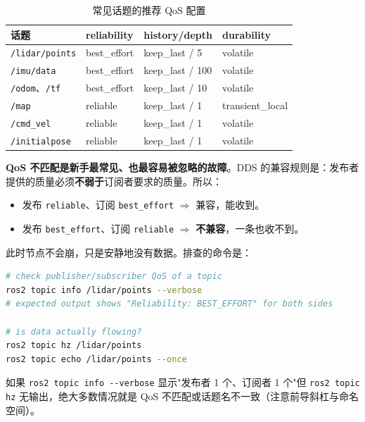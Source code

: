 \begin{table}[htbp]
  \centering
  \caption{常见话题的推荐 QoS 配置}\label{tab:25-qos}
  \small
  \begin{tabular}{llll}
    \toprule
    话题 & reliability & history/depth & durability \\
    \midrule
    \lstinline{/lidar/points} & best\_effort & keep\_last / 5 & volatile \\
    \lstinline{/imu/data} & best\_effort & keep\_last / 100 & volatile \\
    \lstinline{/odom}、\lstinline{/tf} & best\_effort & keep\_last / 10 & volatile \\
    \lstinline{/map} & reliable & keep\_last / 1 & transient\_local \\
    \lstinline{/cmd_vel} & reliable & keep\_last / 1 & volatile \\
    \lstinline{/initialpose} & reliable & keep\_last / 1 & volatile \\
    \bottomrule
  \end{tabular}
\end{table}

\textbf{QoS 不匹配是新手最常见、也最容易被忽略的故障}。DDS 的兼容规则是：发布者提供的质量必须\textbf{不弱于}订阅者要求的质量。所以：

\begin{itemize}
  \item 发布 \lstinline{reliable}、订阅 \lstinline{best_effort} $\Rightarrow$ 兼容，能收到。
  \item 发布 \lstinline{best_effort}、订阅 \lstinline{reliable} $\Rightarrow$ \textbf{不兼容}，一条也收不到。
\end{itemize}

此时节点不会崩，只是安静地没有数据。排查的命令是：

\begin{lstlisting}[language=bash,caption={QoS 不匹配的诊断命令},label={lst:25-qosdiag}]
# check publisher/subscriber QoS of a topic
ros2 topic info /lidar/points --verbose
# expected output shows "Reliability: BEST_EFFORT" for both sides

# is data actually flowing?
ros2 topic hz /lidar/points
ros2 topic echo /lidar/points --once
\end{lstlisting}

如果 \lstinline{ros2 topic info --verbose} 显示"发布者 1 个、订阅者 1 个"但 \lstinline{ros2 topic hz} 无输出，绝大多数情况就是 QoS 不匹配或话题名不一致（注意前导斜杠与命名空间）。

